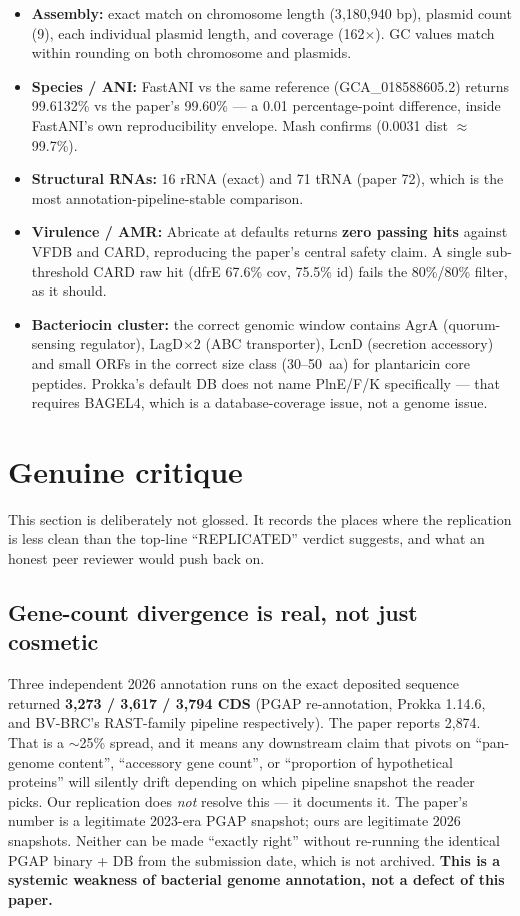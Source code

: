 \documentclass[11pt,a4paper]{article}
\begin{document}
\begin{itemize}[leftmargin=*]
\item \textbf{Assembly:} exact match on chromosome length (3{,}180{,}940 bp),
      plasmid count (9), each individual plasmid length, and coverage
      (162$\times$). GC values match within rounding on both chromosome and
      plasmids.
\item \textbf{Species / ANI:} FastANI vs the same reference (GCA\_018588605.2)
      returns 99.6132\% vs the paper's 99.60\% --- a
      0.01 percentage-point difference, inside FastANI's own reproducibility
      envelope. Mash confirms (0.0031 dist $\approx$ 99.7\%).
\item \textbf{Structural RNAs:} 16 rRNA (exact) and 71 tRNA (paper 72), which
      is the most annotation-pipeline-stable comparison.
\item \textbf{Virulence / AMR:} Abricate at defaults returns
      \textbf{zero passing hits} against VFDB and CARD, reproducing the paper's
      central safety claim. A single sub-threshold CARD raw hit (dfrE
      67.6\% cov, 75.5\% id) fails the 80\%/80\% filter, as it should.
\item \textbf{Bacteriocin cluster:} the correct genomic window contains AgrA
      (quorum-sensing regulator), LagD$\times$2 (ABC transporter), LcnD
      (secretion accessory) and small ORFs in the correct size class
      (30--50~aa) for plantaricin core peptides. Prokka's default DB does not
      name PlnE/F/K specifically --- that requires BAGEL4, which is a
      database-coverage issue, not a genome issue.
\end{itemize}

\section{Genuine critique}
\label{sec:critique}

This section is deliberately not glossed. It records the places where the
replication is less clean than the top-line ``REPLICATED'' verdict suggests,
and what an honest peer reviewer would push back on.

\subsection{Gene-count divergence is real, not just cosmetic}
Three independent 2026 annotation runs on the exact deposited sequence
returned \textbf{3{,}273 / 3{,}617 / 3{,}794 CDS} (PGAP re-annotation,
Prokka 1.14.6, and BV-BRC's RAST-family pipeline respectively). The paper
reports 2{,}874. That is a $\sim$25\% spread, and it means any downstream
claim that pivots on ``pan-genome content'', ``accessory gene count'', or
``proportion of hypothetical proteins'' will silently drift depending on
which pipeline snapshot the reader picks. Our replication does \emph{not}
resolve this --- it documents it. The paper's number is a legitimate
2023-era PGAP snapshot; ours are legitimate 2026 snapshots. Neither can be
made ``exactly right'' without re-running the identical PGAP binary + DB from
the submission date, which is not archived. \textbf{This is a systemic
weakness of bacterial genome annotation, not a defect of this paper.}
\end{document}
